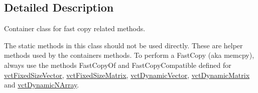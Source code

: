 \subsection{Detailed Description}
Container class for fast copy related methods. 

The static methods in this class should not be used directly. These are helper methods used by the containers methods. To perform a Fast\-Copy (aka memcpy), always use the methods Fast\-Copy\-Of and Fast\-Copy\-Compatible defined for \hyperlink{classvct_fixed_size_vector}{vct\-Fixed\-Size\-Vector}, \hyperlink{classvct_fixed_size_matrix}{vct\-Fixed\-Size\-Matrix}, \hyperlink{classvct_dynamic_vector}{vct\-Dynamic\-Vector}, \hyperlink{classvct_dynamic_matrix}{vct\-Dynamic\-Matrix} and \hyperlink{classvct_dynamic_n_array}{vct\-Dynamic\-N\-Array}. 


